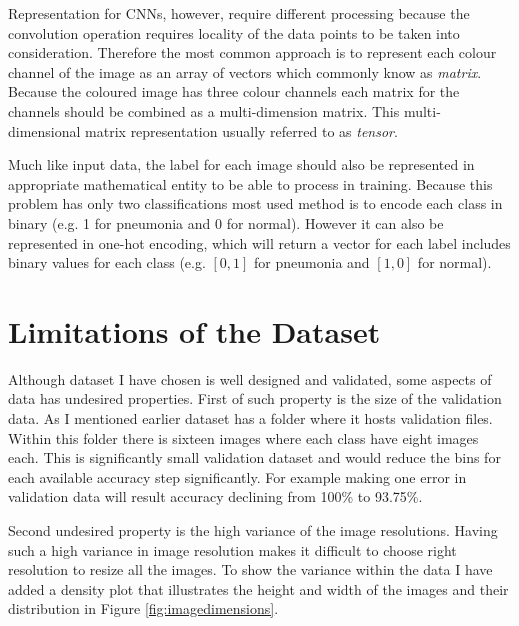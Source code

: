 Representation for CNNs, however, require different processing because the convolution operation requires locality of the data points to be taken into consideration.
Therefore the most common approach is to represent each colour channel of the image as an array of vectors which commonly know as \emph{matrix}.
Because the coloured image has three colour channels each matrix for the channels should be combined as a multi-dimension matrix.
This multi-dimensional matrix representation usually referred to as \emph{tensor}.

Much like input data, the label for each image should also be represented in appropriate mathematical entity to be able to process in training.
Because this problem has only two classifications most used method is to encode each class in binary (e.g. 1 for pneumonia and 0 for normal).
However it can also be represented in one-hot encoding, which will return a vector for each label includes binary values for each class (e.g. $[0, 1]$ for pneumonia and $[1, 0]$ for normal).


\section{Limitations of the Dataset} \label{sec:datalimitations}
Although dataset I have chosen is well designed and validated, some aspects of data has undesired properties.
First of such property is the size of the validation data.
As I mentioned earlier dataset has a folder where it hosts validation files.
Within this folder there is sixteen images where each class have eight images each.
This is significantly small validation dataset and would reduce the bins for each available accuracy step significantly.
For example making one error in validation data will result accuracy declining from 100\% to 93.75\%.

Second undesired property is the high variance of the image resolutions.
Having such a high variance in image resolution makes it difficult to choose right resolution to resize all the images.
To show the variance within the data I have added a density plot that illustrates the height and width of the images and their distribution in Figure \ref{fig:imagedimensions}.

